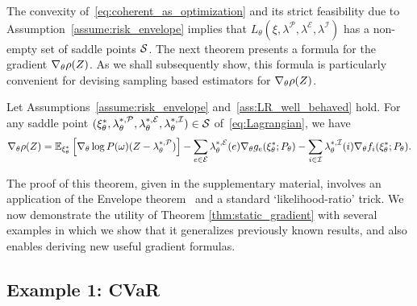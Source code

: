 \documentclass{article} %
\begin{document}
The convexity of~\eqref{eq:coherent_as_optimization} and its strict feasibility due to Assumption~\ref{assume:risk_envelope} implies that $L_{\theta}(\xi,\lambda^{\mathcal P},\lambda^{\mathcal E},\lambda^{\mathcal I})$ has a non-empty set of saddle points $\spset$. The next theorem presents a formula for the gradient $\dt \rho(Z)$. As we shall subsequently show, this formula is particularly convenient for devising sampling based estimators for $\dt \rho(Z)$.
%
\begin{theorem}\label{thm:static_gradient}
Let Assumptions~\ref{assume:risk_envelope} and~\ref{ass:LR_well_behaved} hold. For any saddle point $(\xi^*_{\theta},\lambda^{*,\mathcal P}_{\theta},\lambda^{*,\mathcal E}_{\theta},\lambda^{*,\mathcal I}_{\theta}) \in \spset$ of~\eqref{eq:Lagrangian}, we have
%
\begin{equation*}
  \dt{\rho(Z)} = \ExpW{\dt \log P(\omega) (Z - \lambda^{*,\mathcal P}_{\theta})}{\xi^*_{\theta}}
     - \sum_{e\in\mathcal E} \lambda^{*,\mathcal E}_{\theta}(e) \dt{g_e(\xi^*_{\theta};P_\theta)}
     -\sum_{i\in\mathcal I} \lambda^{*,\mathcal I}_{\theta}(i) \dt{f_i(\xi^*_{\theta};P_\theta)}.
\end{equation*}
\end{theorem}
%
The proof of this theorem, given in the supplementary material, involves an application of the Envelope theorem~\cite{milgrom2002envelope} and a standard `likelihood-ratio' trick. We now demonstrate the utility of Theorem \ref{thm:static_gradient} with several examples in which we show that it generalizes previously known results, and also enables deriving new useful gradient formulas.


\vspace{-0.1in}
\subsection{Example 1: CVaR}
\vspace{-0.05in}
\end{document}
